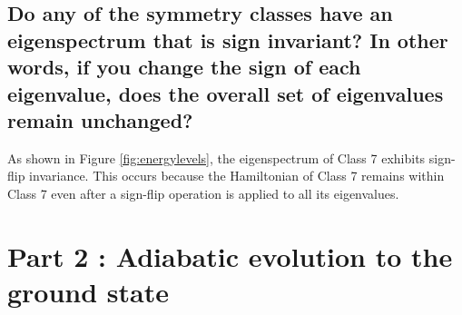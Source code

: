 \documentclass[a4paper, 11pt]{article}
\begin{document}
\subsection*{Do any of the symmetry classes have an eigenspectrum that is sign invariant? In other words, if you change the sign of each eigenvalue, does the overall set of eigenvalues remain unchanged?}

As shown in Figure \ref{fig:energylevels}, the eigenspectrum of Class 7 exhibits sign-flip invariance. This occurs because the Hamiltonian of Class 7 remains within Class 7 even after a sign-flip operation is applied to all its eigenvalues.

\newpage

\section*{Part 2 : Adiabatic evolution to the ground state}
\end{document}

